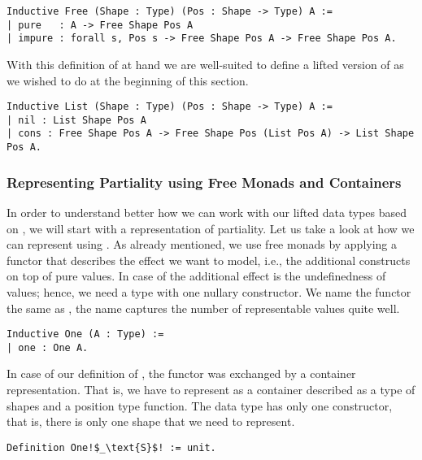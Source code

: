 \begin{verbatim}
Inductive Free (Shape : Type) (Pos : Shape -> Type) A :=
| pure   : A -> Free Shape Pos A
| impure : forall s, Pos s -> Free Shape Pos A -> Free Shape Pos A.
\end{verbatim}

With this definition of  at hand we are well-suited to define a lifted version of  as we wished to do at the beginning of this section.

\begin{verbatim}
Inductive List (Shape : Type) (Pos : Shape -> Type) A :=
| nil : List Shape Pos A
| cons : Free Shape Pos A -> Free Shape Pos (List Pos A) -> List Shape Pos A.
\end{verbatim}

\subsubsection{Representing Partiality using Free Monads and Containers}
\label{subsub:partiality_container}

In order to understand better how we can work with our lifted data types based on , we will start with a representation of partiality.
Let us take a look at how we can represent  using .
As already mentioned, we use free monads by applying a functor  that describes the effect we want to model, i.e., the additional constructs on top of pure values.
In case of  the additional effect is the undefinedness of values; hence, we need a type with one nullary constructor.
We name the functor the same as \citet{swierstra2008data}, the name captures the number of representable values quite well.

\begin{verbatim}
Inductive One (A : Type) :=
| one : One A.
\end{verbatim}

In case of our definition of , the functor was exchanged by a container representation.
That is, we have to represent  as a container described as a type of shapes and a position type function.
The data type  has only one constructor, that is, there is only one shape that we need to represent.

\begin{verbatim}
Definition One!$_\text{S}$! := unit.
\end{verbatim}

